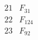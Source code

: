 \documentclass{article}
\begin{document}
{$$\begin{array}{|r|*{7}{r|}}
 & 
 & 
\\
\hline
21 
 &F_{31} &
 & 
 & 
 & 
 & 
 & 
\\
\hline
22 
 &  F_{124}&
 & 
 & 
 & 
 & 
 & 
\\
\hline
23 
 &  F_{92}&
 & 

\end{array}$$}
\end{document}
